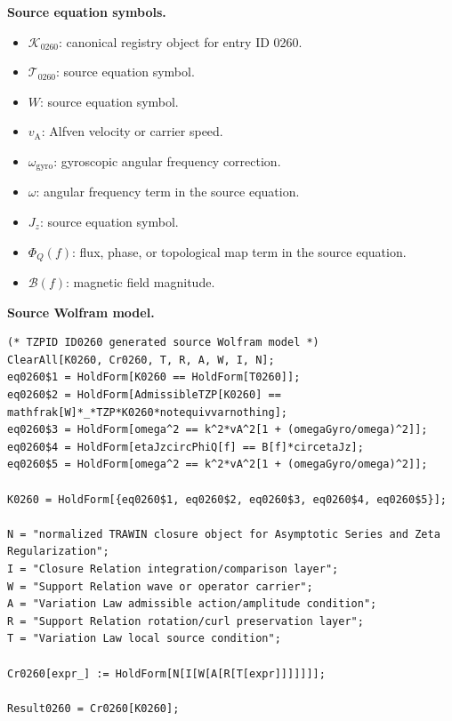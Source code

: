 \begin{minipage}[t]{0.49\linewidth}
\begingroup
\small
\raggedright
\textbf{Source equation symbols.}\par
\begin{itemize}[leftmargin=1.35em,itemsep=1pt,topsep=1pt,parsep=0pt]
    \item $\mathcal{K}_{0260}$: canonical registry object for entry ID 0260.
    \item $\mathcal{T}_{0260}$: source equation symbol.
    \item $W$: source equation symbol.
    \item $v_{\mathrm{A}}$: Alfven velocity or carrier speed.
    \item $\omega_{\mathrm{gyro}}$: gyroscopic angular frequency correction.
    \item $\omega$: angular frequency term in the source equation.
    \item $J_z$: source equation symbol.
    \item $\Phi_Q(f)$: flux, phase, or topological map term in the source equation.
    \item $\mathcal{B}(f)$: magnetic field magnitude.
\end{itemize}
\endgroup
\end{minipage}\hfill
\begin{minipage}[t]{0.47\linewidth}
\begingroup
\scriptsize
\raggedright
\textbf{Source Wolfram model.}\par
\begin{Verbatim}[fontsize=\tiny,breaklines=true,breakanywhere=true]
(* TZPID ID0260 generated source Wolfram model *)
ClearAll[K0260, Cr0260, T, R, A, W, I, N];
eq0260$1 = HoldForm[K0260 == HoldForm[T0260]];
eq0260$2 = HoldForm[AdmissibleTZP[K0260] == mathfrak[W]*_*TZP*K0260*notequivvarnothing];
eq0260$3 = HoldForm[omega^2 == k^2*vA^2[1 + (omegaGyro/omega)^2]];
eq0260$4 = HoldForm[etaJzcircPhiQ[f] == B[f]*circetaJz];
eq0260$5 = HoldForm[omega^2 == k^2*vA^2[1 + (omegaGyro/omega)^2]];

K0260 = HoldForm[{eq0260$1, eq0260$2, eq0260$3, eq0260$4, eq0260$5}];

N = "normalized TRAWIN closure object for Asymptotic Series and Zeta Regularization";
I = "Closure Relation integration/comparison layer";
W = "Support Relation wave or operator carrier";
A = "Variation Law admissible action/amplitude condition";
R = "Support Relation rotation/curl preservation layer";
T = "Variation Law local source condition";

Cr0260[expr_] := HoldForm[N[I[W[A[R[T[expr]]]]]]];

Result0260 = Cr0260[K0260];
\end{Verbatim}
\endgroup
\end{minipage}

